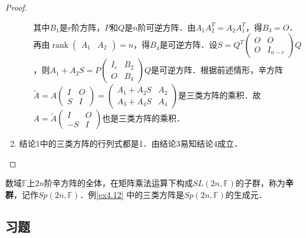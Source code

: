 \documentclass[a4paper,fontset=windows]{ctexbook}
\theoremstyle{definition}
\DeclareMathOperator{\rank}{rank}
\begin{document}
\begin{proof}
\begin{enumerate}
\begin{itemize}
其中$B_1$是$r$阶方阵，$P$和$Q$是$n$阶可逆方阵．由$A_1A_2^T=A_2A_1^T$，得$B_3=O$．再由$\rank\begin{pmatrix}A_1&A_2\end{pmatrix}=n$，得$B_4$是可逆方阵．设$S=Q^T\begin{pmatrix}O&O \\ O&I_{n-r}\end{pmatrix}Q$，则$A_1+A_2S=P\begin{pmatrix}I_r&B_2 \\ O&B_4\end{pmatrix}Q$是可逆方阵．根据前述情形，辛方阵$\widetilde{A}=A\begin{pmatrix}I&O \\ S&I\end{pmatrix}=\begin{pmatrix}A_1+A_2S&A_2 \\ A_3+A_4S&A_4\end{pmatrix}$是三类方阵的乘积．故$A=\widetilde{A}\begin{pmatrix}I&O \\ -S&I\end{pmatrix}$也是三类方阵的乘积．
\end{itemize}

\item 结论1中的三类方阵的行列式都是1．由结论3易知结论4成立．\qedhere
\end{enumerate}
\end{proof}

数域$\mathbb{F}$上$2n$阶辛方阵的全体，在矩阵乘法运算下构成$SL(2n,\mathbb{F})$的子群，称为{\bf 辛群}，记作$Sp(2n,\mathbb{F})$．例\ref{ex4.12} 中的三类方阵是$Sp(2n,\mathbb{F})$的生成元．

\subsection*{习题}
\end{document}
